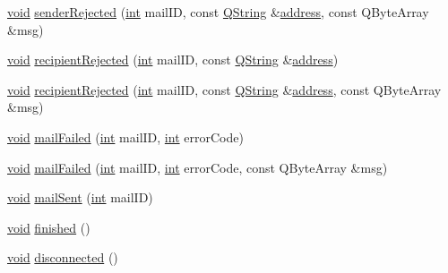 \begin{DoxyCompactItemize}
\item 
\hyperlink{group___u_a_v_objects_plugin_ga444cf2ff3f0ecbe028adce838d373f5c}{void} \hyperlink{class_qxt_smtp_ab53a496470529ab33f3d47b7c0dc7863}{sender\-Rejected} (\hyperlink{ioapi_8h_a787fa3cf048117ba7123753c1e74fcd6}{int} mail\-I\-D, const \hyperlink{group___u_a_v_objects_plugin_gab9d252f49c333c94a72f97ce3105a32d}{Q\-String} \&\hyperlink{glext_8h_a86e3d190561a4ae1e195e1a2bcc83db5}{address}, const Q\-Byte\-Array \&msg)
\item 
\hyperlink{group___u_a_v_objects_plugin_ga444cf2ff3f0ecbe028adce838d373f5c}{void} \hyperlink{class_qxt_smtp_abf10e820ec85258f589d206a79c3b7c8}{recipient\-Rejected} (\hyperlink{ioapi_8h_a787fa3cf048117ba7123753c1e74fcd6}{int} mail\-I\-D, const \hyperlink{group___u_a_v_objects_plugin_gab9d252f49c333c94a72f97ce3105a32d}{Q\-String} \&\hyperlink{glext_8h_a86e3d190561a4ae1e195e1a2bcc83db5}{address})
\item 
\hyperlink{group___u_a_v_objects_plugin_ga444cf2ff3f0ecbe028adce838d373f5c}{void} \hyperlink{class_qxt_smtp_abae53865b044b6d30f2c3b09cfda6b99}{recipient\-Rejected} (\hyperlink{ioapi_8h_a787fa3cf048117ba7123753c1e74fcd6}{int} mail\-I\-D, const \hyperlink{group___u_a_v_objects_plugin_gab9d252f49c333c94a72f97ce3105a32d}{Q\-String} \&\hyperlink{glext_8h_a86e3d190561a4ae1e195e1a2bcc83db5}{address}, const Q\-Byte\-Array \&msg)
\item 
\hyperlink{group___u_a_v_objects_plugin_ga444cf2ff3f0ecbe028adce838d373f5c}{void} \hyperlink{class_qxt_smtp_ac3f7e7676256841bfac74b99b4d8e32a}{mail\-Failed} (\hyperlink{ioapi_8h_a787fa3cf048117ba7123753c1e74fcd6}{int} mail\-I\-D, \hyperlink{ioapi_8h_a787fa3cf048117ba7123753c1e74fcd6}{int} error\-Code)
\item 
\hyperlink{group___u_a_v_objects_plugin_ga444cf2ff3f0ecbe028adce838d373f5c}{void} \hyperlink{class_qxt_smtp_a1dd38d6136253018bc606dda6049796c}{mail\-Failed} (\hyperlink{ioapi_8h_a787fa3cf048117ba7123753c1e74fcd6}{int} mail\-I\-D, \hyperlink{ioapi_8h_a787fa3cf048117ba7123753c1e74fcd6}{int} error\-Code, const Q\-Byte\-Array \&msg)
\item 
\hyperlink{group___u_a_v_objects_plugin_ga444cf2ff3f0ecbe028adce838d373f5c}{void} \hyperlink{class_qxt_smtp_a60ad031b71b4df5f302fa67a2e5841fe}{mail\-Sent} (\hyperlink{ioapi_8h_a787fa3cf048117ba7123753c1e74fcd6}{int} mail\-I\-D)
\item 
\hyperlink{group___u_a_v_objects_plugin_ga444cf2ff3f0ecbe028adce838d373f5c}{void} \hyperlink{class_qxt_smtp_abf087893df9e70d967c55ba3c88089cd}{finished} ()
\item 
\hyperlink{group___u_a_v_objects_plugin_ga444cf2ff3f0ecbe028adce838d373f5c}{void} \hyperlink{class_qxt_smtp_a3ea2a0821c18c1c1abfacf5c8ce90f23}{disconnected} ()
\end{DoxyCompactItemize}
